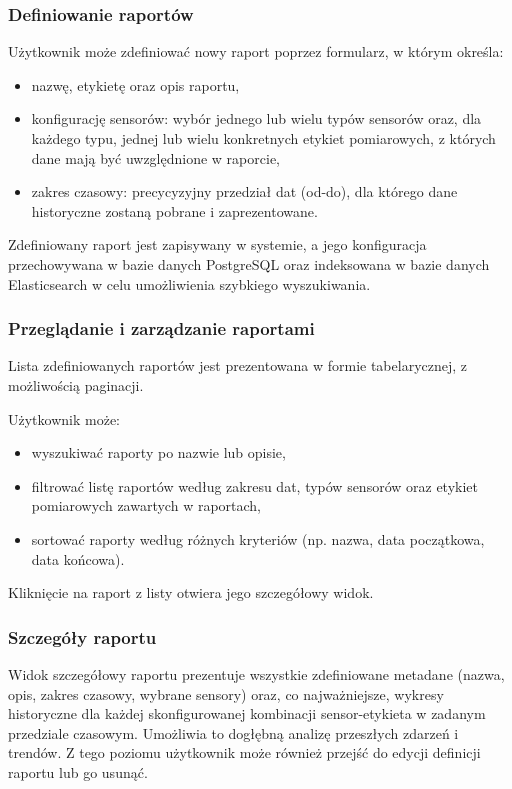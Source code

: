 \subsubsection{Definiowanie raportów}
Użytkownik może zdefiniować nowy raport poprzez formularz, w którym określa:
\begin{itemize}
    \item nazwę, etykietę oraz opis raportu,
    \item konfigurację sensorów: wybór jednego lub wielu typów sensorów oraz, dla każdego typu, jednej lub wielu konkretnych etykiet pomiarowych, z których dane mają być uwzględnione w raporcie,
    \item zakres czasowy: precycyzyjny przedział dat (od-do), dla którego dane historyczne zostaną pobrane i zaprezentowane.
\end{itemize}
Zdefiniowany raport jest zapisywany w systemie, a jego konfiguracja przechowywana w bazie danych PostgreSQL oraz indeksowana w bazie danych Elasticsearch w celu umożliwienia szybkiego wyszukiwania.


\newpage

\subsubsection{Przeglądanie i zarządzanie raportami}

Lista zdefiniowanych raportów jest prezentowana w formie tabelarycznej, z możliwością paginacji. 

\vspace{0.3em}

Użytkownik może:

\begin{itemize}
    \item wyszukiwać raporty po nazwie lub opisie,
    \item filtrować listę raportów według zakresu dat, typów sensorów oraz etykiet pomiarowych zawartych w raportach,
    \item sortować raporty według różnych kryteriów (np. nazwa, data początkowa, data końcowa).
\end{itemize}

Kliknięcie na raport z listy otwiera jego szczegółowy widok.



\subsubsection{Szczegóły raportu}
Widok szczegółowy raportu prezentuje wszystkie zdefiniowane metadane (nazwa, opis, zakres czasowy, wybrane sensory) oraz, co najważniejsze, wykresy historyczne dla każdej skonfigurowanej kombinacji sensor-etykieta w zadanym przedziale czasowym. Umożliwia to dogłębną analizę przeszłych zdarzeń i trendów. Z tego poziomu użytkownik może również przejść do edycji definicji raportu lub go usunąć.


